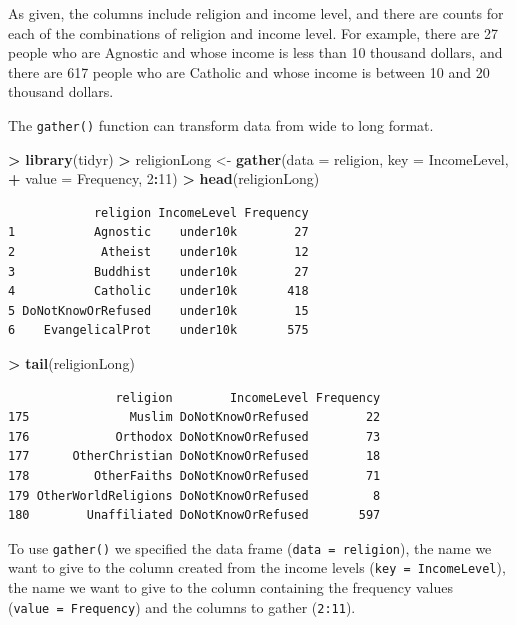 \documentclass[]{krantz}
\makeatletter
\newenvironment{Shaded}{\begin{snugshade}}{\end{snugshade}}
\newcommand{\DataTypeTok}[1]{\textcolor[rgb]{0.27,0.27,0.27}{#1}}
\newcommand{\DecValTok}[1]{\textcolor[rgb]{0.06,0.06,0.06}{#1}}
\newcommand{\KeywordTok}[1]{\textcolor[rgb]{0.27,0.27,0.27}{\textbf{#1}}}
\newcommand{\NormalTok}[1]{#1}
\newcommand{\OperatorTok}[1]{\textcolor[rgb]{0.43,0.43,0.43}{\textbf{#1}}}
\newcommand{\StringTok}[1]{\textcolor[rgb]{0.5,0.5,0.5}{#1}}
\newenvironment{kframe}{%
\medskip{}
\setlength{\fboxsep}{.8em}
 \def\at@end@of@kframe{}%
 \ifinner\ifhmode%
  \def\at@end@of@kframe{\end{minipage}}%
  \begin{minipage}{\columnwidth}%
 \fi\fi%
 \def\FrameCommand##1{\hskip\@totalleftmargin \hskip-\fboxsep
 \colorbox{shadecolor}{##1}\hskip-\fboxsep
     \hskip-\linewidth \hskip-\@totalleftmargin \hskip\columnwidth}%
 \MakeFramed {\advance\hsize-\width
   \@totalleftmargin\z@ \linewidth\hsize
   \@setminipage}}%
 {\par\unskip\endMakeFramed%
 \at@end@of@kframe}
\renewenvironment{Shaded}{\begin{kframe}}{\end{kframe}}
\makeatother
\begin{document}
As given, the columns include religion and income level, and there are counts for each of the combinations of religion and income level. For example, there are 27 people who are Agnostic and whose income is less than 10 thousand dollars, and there are 617 people who are Catholic and whose income is between 10 and 20 thousand dollars.

The \texttt{gather()} function can transform data from wide to long format.

\begin{Shaded}
\begin{Highlighting}[]
\OperatorTok{>}\StringTok{ }\KeywordTok{library}\NormalTok{(tidyr)}
\OperatorTok{>}\StringTok{ }\NormalTok{religionLong <-}\StringTok{ }\KeywordTok{gather}\NormalTok{(}\DataTypeTok{data =}\NormalTok{ religion, }\DataTypeTok{key =}\NormalTok{ IncomeLevel, }
\OperatorTok{+}\StringTok{                        }\DataTypeTok{value =}\NormalTok{ Frequency, }\DecValTok{2}\OperatorTok{:}\DecValTok{11}\NormalTok{)}
\OperatorTok{>}\StringTok{ }\KeywordTok{head}\NormalTok{(religionLong)}
\end{Highlighting}
\end{Shaded}

\begin{verbatim}
            religion IncomeLevel Frequency
1           Agnostic    under10k        27
2            Atheist    under10k        12
3           Buddhist    under10k        27
4           Catholic    under10k       418
5 DoNotKnowOrRefused    under10k        15
6    EvangelicalProt    under10k       575
\end{verbatim}

\begin{Shaded}
\begin{Highlighting}[]
\OperatorTok{>}\StringTok{ }\KeywordTok{tail}\NormalTok{(religionLong)}
\end{Highlighting}
\end{Shaded}

\begin{verbatim}
               religion        IncomeLevel Frequency
175              Muslim DoNotKnowOrRefused        22
176            Orthodox DoNotKnowOrRefused        73
177      OtherChristian DoNotKnowOrRefused        18
178         OtherFaiths DoNotKnowOrRefused        71
179 OtherWorldReligions DoNotKnowOrRefused         8
180        Unaffiliated DoNotKnowOrRefused       597
\end{verbatim}

To use \texttt{gather()} we specified the data frame (\texttt{data\ =\ religion}), the name we want to give to the column created from the income levels (\texttt{key\ =\ IncomeLevel}), the name we want to give to the column containing the frequency values (\texttt{value\ =\ Frequency}) and the columns to gather (\texttt{2:11}).
\end{document}
